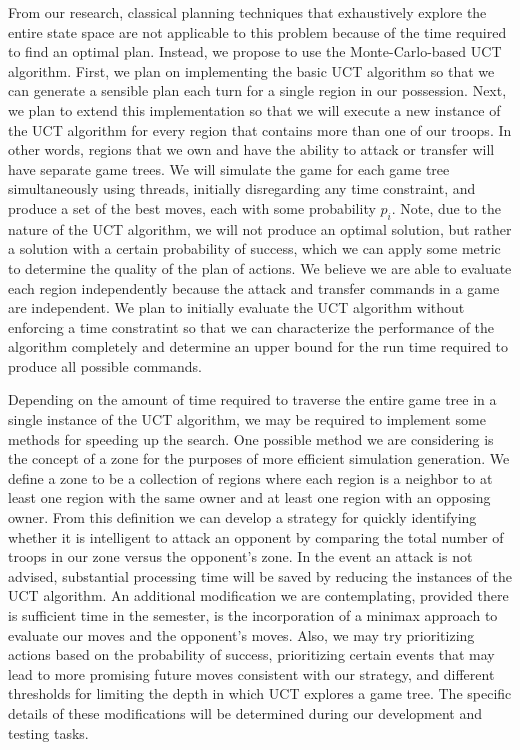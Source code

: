 \documentclass[a4paper,11pt]{article}
\begin{document}
From our research, classical planning techniques that exhaustively explore the entire state space are not applicable to this problem because of the time required to find an optimal plan. Instead, we propose to use the Monte-Carlo-based UCT algorithm.  First, we plan on implementing the basic UCT algorithm so that we can generate a sensible plan each turn for a single region in our possession.  Next, we plan to extend this implementation so that we will execute a new instance of the UCT algorithm for every region that contains more than one of our troops.  In other words, regions that we own and have the ability to attack or transfer will have separate game trees. We will simulate the game for each game tree simultaneously using threads, initially disregarding any time constraint, and produce a set of the best moves, each with some probability $p_{i}$. Note, due to the nature of the UCT algorithm, we will not produce an optimal solution, but rather a solution with a certain probability of success, which we can apply some metric to determine the quality of the plan of actions. We believe we are able to evaluate each region independently because the attack and transfer commands in a game are independent. We plan to initially evaluate the UCT algorithm without enforcing a time constratint so that we can characterize the performance of the algorithm completely and determine an upper bound for the run time required to produce all possible commands. 

Depending on the amount of time required to traverse the entire game tree in a single instance of the UCT algorithm, we may be required to implement some methods for speeding up the search. One possible method we are considering is the concept of a zone for the purposes of more efficient simulation generation.  We define a zone to be a collection of regions where each region is a neighbor to at least one region with the same owner and at least one region with an opposing owner.  From this definition we can develop a strategy for quickly identifying whether it is intelligent to attack an opponent by comparing the total number of troops in our zone versus the opponent's zone.  In the event an attack is not advised, substantial processing time will be saved by reducing the instances of the UCT algorithm.  An additional modification we are contemplating, provided there is sufficient time in the semester, is the incorporation of a minimax approach to evaluate our moves and the opponent's moves.  Also, we may try prioritizing actions based on the probability of success, prioritizing certain events that may lead to more promising future moves consistent with our strategy, and different thresholds for limiting the depth in which UCT explores a game tree. The specific details of these modifications will be determined during our development and testing tasks.
\end{document}
